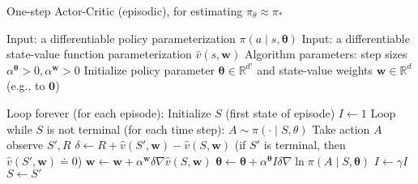 One-step Actor-Critic (episodic), for estimating \( \pi_\theta \approx \pi_* \)

Input: a differentiable policy parameterization \( \pi(a \mid s, \mathbf\theta) \)
Input: a differentiable state-value function parameterization \( \hat{v}(s, \mathbf{w}) \)
Algorithm parameters: step sizes \( \alpha^\mathbf\theta > 0 , \alpha^\mathbf{w} > 0 \)
Initialize policy parameter \( \mathbf\theta \in \mathbb{R}^{d'} \) and state-value weights \( \mathbf{w} \in \mathbb{R}^d \) (e.g., to \( \mathbf{0} \))

Loop forever (for each episode):
	Initialize \( S \) (first state of episode)
	\( I \leftarrow 1 \)
	Loop while \( S \) is not terminal (for each time step):
		\( A \sim \pi(\cdot \mid S, \theta) \)
		Take action \( A \) observe \( S', R \)
		\( \delta \leftarrow R +  \hat{v}(S', \mathbf{w}) - \hat{v}(S, \mathbf{w}) \)
			(if \( S' \) is terminal, then \( \hat{v}(S', \mathbf{w}) \doteq 0 \))
		\( \mathbf{w} \leftarrow \mathbf{w} + \alpha^\mathbf{w}\delta\nabla{\hat{v}(S, \mathbf{w})} \)
		\( \mathbf\theta \leftarrow \mathbf\theta + \alpha^\mathbf\theta I \delta \nabla{\ln{\pi(A \mid S, \mathbf\theta)}} \)
		\( I \leftarrow \gamma I \)
		\( S \leftarrow S' \)
